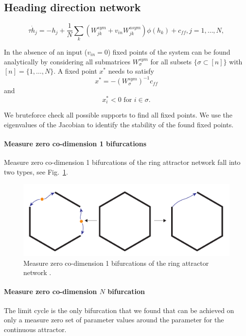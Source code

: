 \documentclass{article} %
\newcounter{ct}
\theoremstyle{definition}
\theoremstyle{remark}
\begin{document}
\subsection{Heading direction network}\label{sec:supp:headdirection}

\begin{equation}
\tau \dot h_j = -h_j + \frac{1}{N} \sum_k (W^{sym}_{jk} + v_{in} W^{asym}_{jk})\phi(h_k)+c_{ff},     j=1,\dots,N,
\end{equation}

In the absence of an input (\(v_{in}=0\)) fixed points of the system can be found analytically by considering all submatrices \(W^{sym}_\sigma\) for all subsets \(\{\sigma\subset [n]\}\) with\([n]=\{1,\dots, N\}\).
A fixed point \(x^*\) needs to satisfy
\begin{equation}
x^*= -(W^{sym}_\sigma)^{-1}c_{ff}
\end{equation}
and
\begin{equation}
x^*_i<0 \text{   for  	 } i\in\sigma.
\end{equation}

We bruteforce check all possible supports to find all fixed points.
We use the eigenvalues of the Jacobian to identify the stability of the found fixed points.


\paragraph{Measure zero co-dimension 1 bifurcations}
Measure zero co-dimension 1 bifurcations of the ring attractor network fall into two types, see Fig.~\ref{fig:meaure_zero_perturbations}.

\begin{figure}[tbhp]
     \centering
    \includegraphics[width=\textwidth]{ring_n6_perturbations_schematic}
       \caption{Measure zero co-dimension 1 bifurcations of the ring attractor network \citep{Noorman2022}.}\label{fig:meaure_zero_perturbations}
\end{figure}


\paragraph{Measure zero co-dimension \(N\) bifurcation}
The limit cycle is the only bifurcation that we found that can be achieved on only a measure zero set of parameter values around the parameter for the continuous attractor.
\end{document}
